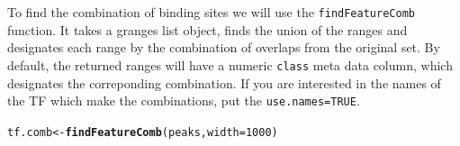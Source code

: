 \documentclass{article}\usepackage[]{graphicx}\usepackage[]{color}
\makeatletter
\newcommand{\hlnum}[1]{\textcolor[rgb]{0.686,0.059,0.569}{#1}}%
\newcommand{\hlstd}[1]{\textcolor[rgb]{0.345,0.345,0.345}{#1}}%
\newcommand{\hlkwb}[1]{\textcolor[rgb]{0.69,0.353,0.396}{#1}}%
\newcommand{\hlkwc}[1]{\textcolor[rgb]{0.333,0.667,0.333}{#1}}%
\newcommand{\hlkwd}[1]{\textcolor[rgb]{0.737,0.353,0.396}{\textbf{#1}}}%
\newenvironment{kframe}{%
 \def\at@end@of@kframe{}%
 \ifinner\ifhmode%
  \def\at@end@of@kframe{\end{minipage}}%
  \begin{minipage}{\columnwidth}%
 \fi\fi%
 \def\FrameCommand##1{\hskip\@totalleftmargin \hskip-\fboxsep
 \colorbox{shadecolor}{##1}\hskip-\fboxsep
     \hskip-\linewidth \hskip-\@totalleftmargin \hskip\columnwidth}%
 \MakeFramed {\advance\hsize-\width
   \@totalleftmargin\z@ \linewidth\hsize
   \@setminipage}}%
 {\par\unskip\endMakeFramed%
 \at@end@of@kframe}
\newenvironment{knitrout}{}{} %
\newcommand{\Rcode}[1]{{\texttt{#1}}}
\makeatother
\begin{document}
To find the combination of binding sites we will use the \Rcode{findFeatureComb}
function. It takes a granges list object, finds the union of the 
ranges and designates each range by the combination of overlaps from the original set.
By default, the returned ranges will have a numeric \Rcode{class}
meta data column, which designates the correponding combination. 
If you are interested in the names of the TF which make 
the combinations, put the \Rcode{use.names=TRUE}.
\begin{knitrout}
\color{fgcolor}\begin{kframe}
\begin{alltt}
\hlstd{tf.comb} \hlkwb{<-} \hlkwd{findFeatureComb}\hlstd{(peaks,} \hlkwc{width} \hlstd{=} \hlnum{1000}\hlstd{)}
\end{alltt}
\end{kframe}
\end{knitrout}
\end{document}
